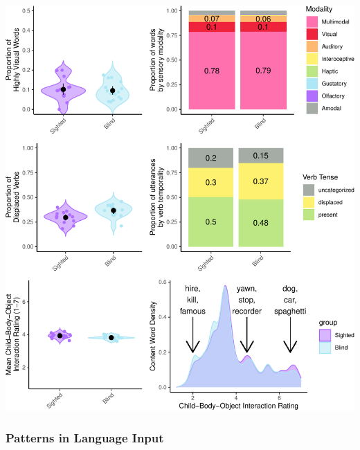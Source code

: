 \documentclass[
  man,floatsintext]{apa6}
\begin{document}
\includegraphics{input_quality_manuscript_files/figure-latex/conceptual-plots-1.pdf}

\hypertarget{patterns-in-language-input}{%
\subsubsection{Patterns in Language Input}\label{patterns-in-language-input}}
\end{document}
